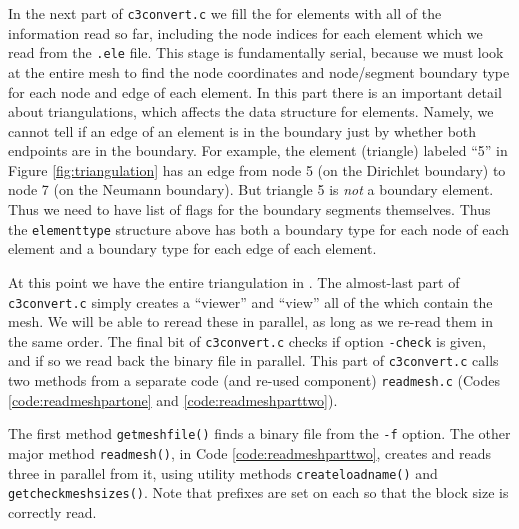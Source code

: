 
In the next part of \texttt{c3convert.c} we fill the \pVec for elements with all of the information read so far, including the node indices for each element which we read from the \texttt{.ele} file.  This stage is fundamentally serial, because we must look at the entire mesh to find the node coordinates and node/segment boundary type for each node and edge of each element.  In this part there is an important detail about triangulations, which affects the data structure for elements.  Namely, we cannot tell if an edge of an element is in the boundary just by whether both endpoints are in the boundary.  For example, the element (triangle) labeled ``5'' in Figure \ref{fig:triangulation} has an edge from node 5 (on the Dirichlet boundary) to node 7 (on the Neumann boundary).  But triangle 5 is \emph{not} a boundary element.  Thus we need to have list of flags for the boundary segments themselves.  Thus the \texttt{elementtype} structure above has both a boundary type for each node of each element and a boundary type for each edge of each element.

At this point we have the entire triangulation in \PETSc \pVecs.  The almost-last part of \texttt{c3convert.c} simply creates a \PETSc ``viewer'' and ``view'' all of the \pVecs which contain the mesh.  We will be able to reread these \pVecs in parallel, as long as we re-read them in the same order.  The final bit of \texttt{c3convert.c} checks if option \texttt{-check} is given, and if so we read back the binary file in parallel.  This part of \texttt{c3convert.c} calls two methods from a separate code (and re-used component) \texttt{readmesh.c} (Codes \ref{code:readmeshpartone} and \ref{code:readmeshparttwo}).

The first method \texttt{getmeshfile()} finds a \PETSc binary file from the \texttt{-f} option.  The other major method \texttt{readmesh()}, in Code \ref{code:readmeshparttwo}, creates and reads three \pVecs in parallel from it, using utility methods \texttt{createloadname()} and \texttt{getcheckmeshsizes()}.  Note that prefixes are set on each \pVec so that the block size is correctly read.


